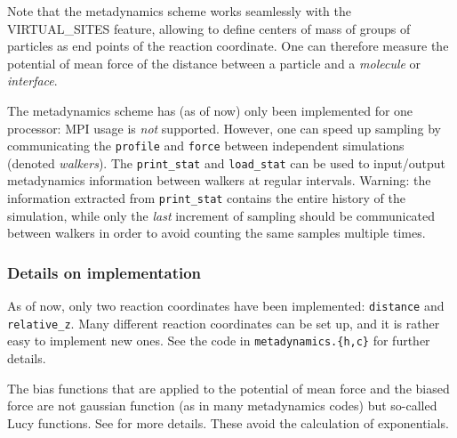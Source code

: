 Note that the metadynamics scheme works seamlessly with the
VIRTUAL_SITES feature, allowing to define centers of mass of groups of
particles as end points of the reaction coordinate. One can therefore
measure the potential of mean force of the distance between a particle
and a \emph{molecule} or \emph{interface}.

The metadynamics scheme has (as of now) only been implemented for one
processor: MPI usage is \emph{not} supported. However, one can speed up
sampling by communicating the \texttt{profile} and \texttt{force}
between independent simulations (denoted \emph{walkers}). The
\texttt{print_stat} and \texttt{load_stat} can be used to input/output
metadynamics information between walkers at regular
intervals. Warning: the information extracted from \texttt{print_stat}
contains the entire history of the simulation, while only the
\emph{last} increment of sampling should be communicated between
walkers in order to avoid counting the same samples multiple times.

\subsubsection{Details on implementation}

As of now, only two reaction coordinates have been implemented:
\texttt{distance} and \texttt{relative_z}. Many different reaction
coordinates can be set up, and it is rather easy to implement new
ones. See the code in \texttt{metadynamics.\{h,c\}} for further
details. 

The bias functions that are applied to the potential of mean force and
the biased force are not gaussian function (as in many metadynamics
codes) but so-called Lucy functions. See \cite{marsili09} for more
details. These avoid the calculation of exponentials.

